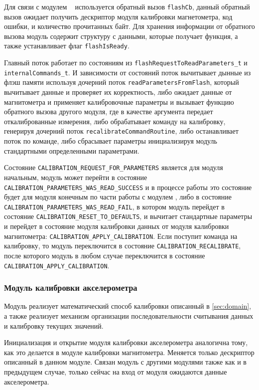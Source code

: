 Для связи с модулем \moduleFlashMemory~ используется обратный вызов \lstinline{flashCb}, данный обратный вызов ожидает получить дескриптор модуля калибровки магнетометра, код ошибки,
и количество прочитанных байт. Для хранения информации от обратного вызова модуль содержит структуру с данными, которые получает функция, а также устанавливает флаг \lstinline{flashIsReady}.

Главный поток работает по состояниям из \lstinline{flashRequestToReadParameters_t} и \lstinline{internalCommands_t}. И зависимости от состояний
поток вычитывает дынные из флэш памяти используя дочерний поток \lstinline{readParametersFromFlash}, который вычитывает данные и проверяет их корректность,
либо ожидает данные от магнитометра и применяет калибровочные параметры и вызывает функцию обратного вызова другого модуля, где в качестве аргумента передает откалиброванные измерения,
либо обрабатывает команду на калибровку, генерируя дочерний поток \lstinline{recalibrateCommandRoutine}, либо останавливает поток по команде, либо сбрасывает параметры инициализируя модуль
стандартными определенными параметрами.

Состояние \lstinline{CALIBRATION_REQUEST_FOR_PARAMETERS} является для модуля начальным, модуль может перейти в состояние \lstinline{CALIBRATION_PARAMETERS_WAS_READ_SUCCESS} и в процессе работы это состояние
будет для модуля конечным по части работы с модулем \moduleFlashMemory, либо в состояние \lstinline{CALIBRATION_PARAMETERS_WAS_READ_FAIL},
в котором модуль перейдет в состояние \lstinline{CALIBRATION_RESET_TO_DEFAULTS}, и вычитает стандартные
параметры и перейдет в состояние модуля калибровки данных от модуля калибровки магнитометра: \lstinline{CALIBRATION_APPLY_CALIBRATION}.
Если поступит команда на калибровку, то модуль переключится в состояние \lstinline{CALIBRATION_RECALIBRATE}, после которого модуль в любом случае переключится в состояние
\lstinline{CALIBRATION_APPLY_CALIBRATION}.

\subsubsection{Модуль калибровки акселерометра}

Модуль реализует математический способ калибровки описанный в \ref{sec:domain}, а также реализует механизм организации последовательности считывания данных и калибровку
текущих значений. 

Инициализация и открытие модуля калибровки акселерометра аналогична тому, как это делается в модуле калибровки магнитометра. Меняется только дескриптор описанный в данном модуле.
Связан модуль с другими модулями также как и в предыдущем случае, только сейчас на вход от модуля \modulePerifery ожидаются данные акселерометра.

